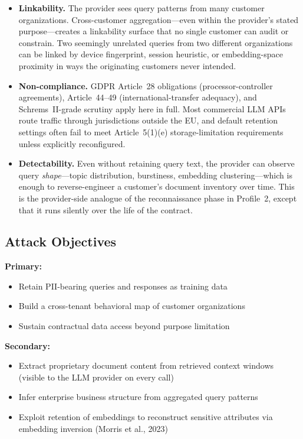\documentclass[a4paper,12pt]{report}
\begin{document}
\begin{prosebox}
\begin{itemize}[leftmargin=1.4em, itemsep=5pt]
  \item \textbf{Linkability.} The provider sees query patterns from many
        customer organizations. Cross-customer aggregation---even within
        the provider's stated purpose---creates a linkability surface that
        no single customer can audit or constrain. Two seemingly unrelated
        queries from two different organizations can be linked by device
        fingerprint, session heuristic, or embedding-space proximity in
        ways the originating customers never intended.
  \item \textbf{Non-compliance.} GDPR Article~28 obligations
        (processor-controller agreements), Article~44--49
        (international-transfer adequacy), and Schrems~II-grade scrutiny
        apply here in full. Most commercial LLM APIs route traffic through
        jurisdictions outside the EU, and default retention settings often
        fail to meet Article~5(1)(e) storage-limitation requirements
        unless explicitly reconfigured.
  \item \textbf{Detectability.} Even without retaining query text, the
        provider can observe query \emph{shape}---topic distribution,
        burstiness, embedding clustering---which is enough to reverse-engineer
        a customer's document inventory over time. This is the
        provider-side analogue of the reconnaissance phase in Profile~2,
        except that it runs silently over the life of the contract.
\end{itemize}
\end{prosebox}

\subsection{Attack Objectives}

\begin{prosebox}
\textbf{Primary:}
\begin{itemize}[leftmargin=1.4em, itemsep=2pt]
  \item Retain PII-bearing queries and responses as training data
  \item Build a cross-tenant behavioral map of customer organizations
  \item Sustain contractual data access beyond purpose limitation
\end{itemize}
\textbf{Secondary:}
\begin{itemize}[leftmargin=1.4em, itemsep=2pt]
  \item Extract proprietary document content from retrieved context windows
        (visible to the LLM provider on every call)
  \item Infer enterprise business structure from aggregated query patterns
  \item Exploit retention of embeddings to reconstruct sensitive attributes
        via embedding inversion (Morris et al., 2023)
\end{itemize}
\end{prosebox}
\end{document}
